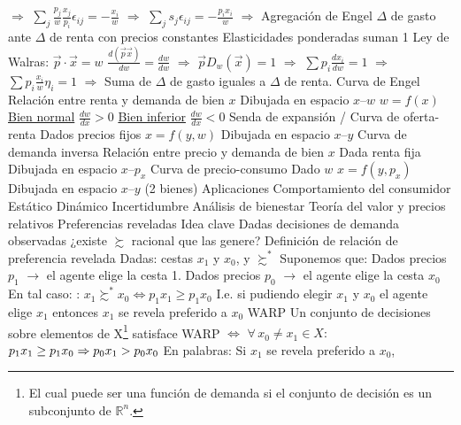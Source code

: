 \documentclass{nuevotema}
\begin{document}
\begin{esquemal}
				\4[] $\Rightarrow$ $ \sum_j \frac{p_j}{w} \frac{x_j}{p_i} \epsilon_{ij} = -\frac{x_i}{w}$
				\4[] $\Rightarrow$ $\sum_j s_j \epsilon_{ij} = -\frac{p_i x_i}{w}$
				\4[] $\Rightarrow$ 
			\3 Agregación de Engel
				\4[] $\varDelta$ de gasto ante $\varDelta$ de renta con precios constantes
				\4[] Elasticidades ponderadas suman 1
				\4[] Ley de Walras: $\vec{p} \cdot \vec{x} = w$
				\4[] $\frac{d(\vec{p} \vec{x})}{dw} = \frac{dw}{dw}$
				\4[] $\Rightarrow$ $\vec{p} D_w (\vec{x}) = 1$
				\4[] $\Rightarrow$ $\sum p_i \frac{dx_i}{dw} = 1$
				\4[] $\Rightarrow$ $\sum p_i \frac{x_i}{w} \eta_i = 1$
				\4[] $\Rightarrow$ 
				\4[] Suma de $\varDelta$ de gasto iguales a $\varDelta$ de renta.
			\3 Curva de Engel
				\4 Relación entre renta y demanda de bien $x$
				\4 Dibujada en espacio $x$--$w$
				\4[$\to$] $w = f(x)$
				\4 \underline{Bien normal}
				\4[] $\frac{dw}{dx} > 0$
				\4 \underline{Bien inferior}
				\4[] $\frac{dw}{dx} < 0$
			\3 Senda de expansión / Curva de oferta-renta
				\4 Dados precios fijos
				\4[] $x = f(y, w)$
				\4[] Dibujada en espacio $x$--$y$
			\3 Curva de demanda inversa
				\4[] Relación entre precio y demanda de bien $x$
				\4[] Dada renta fija
				\4[] Dibujada en espacio $x$--$p_x$
			\3 Curva de precio-consumo
				\4[] Dado $w$
				\4[] $x = f(y, p_x)$
				\4[] Dibujada en espacio $x$--$y$ (2 bienes)
		\2 Aplicaciones
			\3 Comportamiento del consumidor
				\4 Estático
				\4 Dinámico
				\4 Incertidumbre
			\3 Análisis de bienestar
			\3 Teoría del valor y precios relativos
	\1 
		\2 Preferencias reveladas
			\3 Idea clave
				\4 Dadas decisiones de demanda observadas
				\4[] ¿existe $\succsim$ racional que las genere?
			\3 Definición de relación de preferencia revelada
				\4 Dadas: cestas $x_1$ y $x_0$, y $\succsim^*$
				\4 Suponemos que:
				\4[] Dados precios $p_1$
				\4[] $\to$ el agente elige la cesta 1.
				\4[] Dados precios $p_0$
				\4[] $\to$ el agente elige la cesta $x_0$
				\4 En tal caso:
				\4: $x_1 \succsim^* x_0 \iff p_1 x_1 \geq p_1 x_0$
				\4 I.e. si pudiendo elegir $x_1$ y $x_0$ el agente elige $x_1$
				\4[$\then$] entonces $x_1$ se revela preferido a $x_0$
			\3 WARP
				\4 Un conjunto de decisiones sobre elementos de X\footnote{El cual puede ser una función de demanda si el conjunto de decisión es un subconjunto de $\mathbb{R}^n$.}
				\4[] satisface WARP $\iff$
				\4[] $\forall \, x_0 \neq x_1 \in X:$
				\4[] $p_1 x_ 1 \geq p_1 x_0 \Rightarrow p_0 x_1 > p_0 x_0$
				\4 En palabras:
				\4[] Si $x_1$ se revela preferido a $x_0$,

\end{esquemal}
\end{document}
